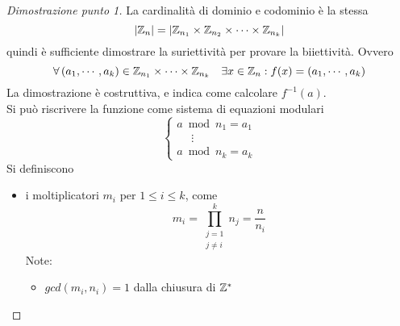 \begin{proof}
    [Dimostrazione punto 1]
    La cardinalità di dominio e codominio è la stessa
    \begin{equation*}
        |
        \mathbb{Z}_{n} 
        | = |
        \mathbb{Z}_{n_1} \times
        \mathbb{Z}_{n_2} \times
        \cdots
        \times
        \mathbb{Z}_{n_k}
        |
    \end{equation*}
    quindi è sufficiente dimostrare la suriettività per provare la biiettività.
    Ovvero
    \begin{equation*}
        \forall
        \left( 
            a_1, \cdots, a_k
        \right) 
        \in 
        \mathbb{Z}_{n_1} \times
        \cdots
        \times
        \mathbb{Z}_{n_k}
        \quad
        \exists x \in \mathbb{Z}_{n} 
        :
        f(x) =
        \left( 
            a_1, \cdots, a_k
        \right) 
    \end{equation*}
    La dimostrazione è costruttiva, e indica come calcolare $
    f^{-1}
    (a)
    $.
    \\
    Si può riscrivere la funzione come sistema di equazioni modulari
    \begin{equation*}
        \begin{cases}
            a \bmod n_1 = a_1
            \\
            \quad
            \;
            \vdots
            \\
            a \bmod n_k = a_k
        \end{cases}
    \end{equation*}
    Si definiscono
    \begin{itemize}
        \item i moltiplicatori $
            m_i
            $ per $
            1 \leq i \leq k
            $, come
            \begin{equation*}
                m_i = 
                \prod_{
                    \substack{
                        j=1
                        \\
                        j \ne i
                    }
                }^{k} n_j
                =
                \frac{n}{n_i}
            \end{equation*}
            Note:
            \begin{itemize}[noitemsep,parsep=0pt,partopsep=0pt,topsep=0pt]
                \item $
                    gcd(m_i, n_i) = 1
                    $ dalla chiusura di $\mathbb{Z}_{}^{*} $

\end{itemize}
\end{itemize}
\end{proof}
